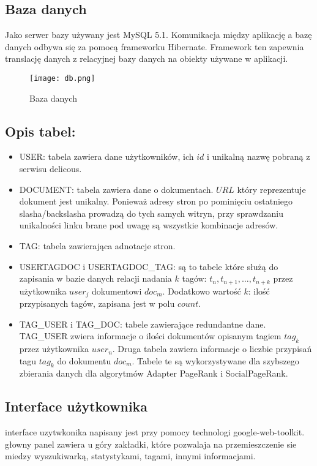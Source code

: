 \subsection{Baza danych}

Jako serwer bazy używany jest MySQL 5.1. Komunikacja między aplikację a bazę danych odbywa się za pomocą frameworku Hibernate. Framework ten zapewnia translację danych z relacyjnej bazy danych na obiekty używane w aplikacji. 


\begin{figure}[htb]
\centering
\texttt{[image: db.png]}
\caption{Baza danych}
\label{fig:db_fig}
\end{figure}


\subsection*{Opis tabel:}
\begin{itemize}
	\item USER: tabela zawiera dane użytkowników, ich $id$ i unikalną nazwę pobraną z serwisu delicous.
	\item DOCUMENT: tabela zawiera dane o dokumentach. $URL$ który reprezentuje dokument jest unikalny. Ponieważ adresy stron po pominięciu ostatniego slasha/backslasha prowadzą do tych samych witryn, przy sprawdzaniu unikalności linku brane pod uwagę są wszystkie kombinacje adresów.
	\item TAG: tabela zawierająca adnotacje stron.
	\item USERTAGDOC i USERTAGDOC\_TAG: są to tabele które służą do zapisania w bazie danych relacji nadania $k$ tagów: $t_n, t_{n+1}, \dots, t_{n+k}$ przez użytkownika $user_j$  dokumentowi $doc_m$. Dodatkowo wartość $k$: ilość przypisanych tagów, zapisana jest w polu $count$.
	\item TAG\_USER i TAG\_DOC: tabele zawierające redundantne dane. TAG\_USER zwiera informacje o ilości dokumentów opisanym tagiem $tag_k$ przez użytkownika $user_n$. Druga tabela zawiera informacje o liczbie przypisań tagu $tag_k$ do dokumentu $doc_m$. Tabele te są wykorzystywane dla szybszego zbierania danych dla algorytmów Adapter PageRank i SocialPageRank.
\end{itemize}



\subsection{Interface użytkownika}
interface uzytwkonika napisany jest przy pomocy technologi google-web-toolkit.
głowny panel zawiera u góry zakładki, które pozwalaja na przemieszczenie sie miedzy wyszukiwarką, statystykami, tagami, innymi informacjami.

